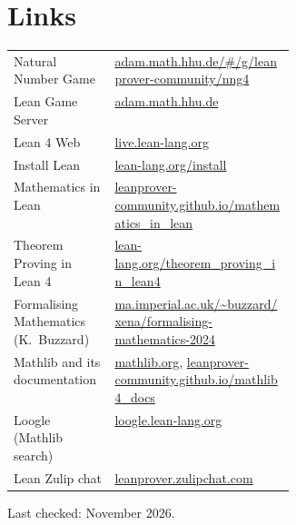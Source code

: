 \documentclass[11pt]{article}
\begin{document}
\section{Links}
\small
\begin{tabularx}{\linewidth}{@{}p{0.36\linewidth}L@{}}
Natural Number Game & \href{https://adam.math.hhu.de/\#/g/leanprover-community/nng4}{adam.math.hhu.de/\#/g/leanprover-community/nng4} \\
Lean Game Server & \href{https://adam.math.hhu.de/}{adam.math.hhu.de} \\
Lean 4 Web & \href{https://live.lean-lang.org/}{live.lean-lang.org} \\
Install Lean & \href{https://lean-lang.org/install/}{lean-lang.org/install} \\
Mathematics in Lean & \href{https://leanprover-community.github.io/mathematics_in_lean/}{leanprover-community.github.io/mathematics\_in\_lean} \\
Theorem Proving in Lean 4 & \href{https://lean-lang.org/theorem_proving_in_lean4/}{lean-lang.org/theorem\_proving\_in\_lean4} \\
Formalising Mathematics (K.~Buzzard) & \href{https://www.ma.imperial.ac.uk/~buzzard/xena/formalising-mathematics-2024/}{ma.imperial.ac.uk/\textasciitilde buzzard/xena/formalising-mathematics-2024} \\
Mathlib and its documentation & \href{https://mathlib.org/}{mathlib.org}, \href{https://leanprover-community.github.io/mathlib4_docs/}{leanprover-community.github.io/mathlib4\_docs} \\
Loogle (Mathlib search) & \href{https://loogle.lean-lang.org/}{loogle.lean-lang.org} \\
Lean Zulip chat & \href{https://leanprover.zulipchat.com/}{leanprover.zulipchat.com} \\
\end{tabularx}

\vspace{0.4em}
{\color{muted}Last checked: November 2026.}
\end{document}
